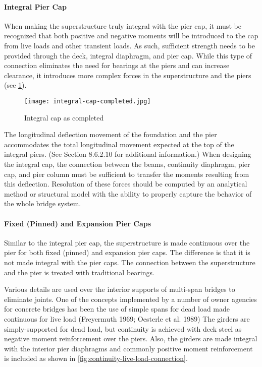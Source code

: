 \paragraph{Integral Pier Cap}

When making the superstructure truly integral with the pier cap, it must be recognized that both positive and
negative moments will be introduced to the cap from live loads and other transient loads. As such, sufficient strength
needs to be provided through the deck, integral diaphragm, and pier cap. While this type of connection eliminates the
need for bearings at the piers and can increase clearance, it introduces more complex forces in the superstructure and
the piers (see \cref{fig:integral-cap-completed}).

\begin{figure}
  \texttt{[image: integral-cap-completed.jpg]}
  \caption{Integral cap as completed}
  \label{fig:integral-cap-completed}
\end{figure}

The longitudinal deflection movement of the foundation and the pier accommodates the total longitudinal movement expected at the top of the integral piers. (See Section 8.6.2.10 for additional information.) When designing the integral cap, the connection between the beams, continuity diaphragm, pier cap, and pier column must be sufficient to transfer the moments resulting from this deflection. Resolution of these forces should be computed by an analytical method or structural model with the ability to properly capture the behavior of the whole bridge system.

\paragraph{Fixed (Pinned) and Expansion Pier Caps}

Similar to the integral pier cap, the superstructure is made continuous over the pier for both fixed (pinned) and expansion pier caps. The difference is that it is not made integral with the pier caps. The connection between the superstructure and the pier is treated with traditional bearings.

Various details are used over the interior supports of multi-span bridges to eliminate joints. One of the concepts implemented by a number of owner agencies for concrete bridges has been the use of simple spans for dead load made continuous for live load (Freyermuth 1969; Oesterle et al. 1989) The girders are simply-supported for dead load, but continuity is achieved with deck steel as negative moment reinforcement over the piers. Also, the girders are made integral with the interior pier diaphragms and commonly positive moment reinforcement is included as shown in \cref{fig:continuity-live-load-connection}.

